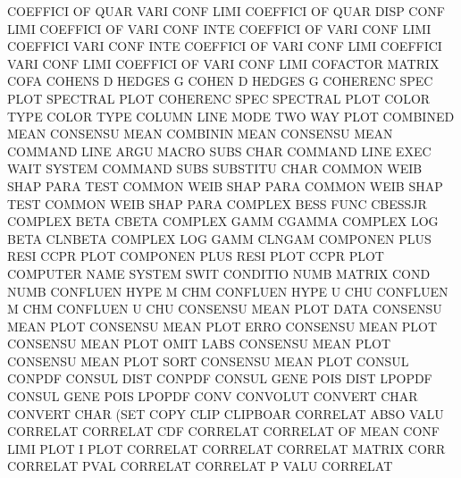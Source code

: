 COEFFICI OF   QUAR VARI CONF LIMI       COEFFICI OF   QUAR DISP CONF LIMI
COEFFICI OF   VARI CONF INTE            COEFFICI OF   VARI CONF LIMI
COEFFICI VARI CONF INTE                 COEFFICI OF   VARI CONF LIMI
COEFFICI VARI CONF LIMI                 COEFFICI OF   VARI CONF LIMI
COFACTOR                                MATRIX   COFA
COHENS   D                              HEDGES   G
COHEN    D                              HEDGES   G
COHERENC SPEC PLOT                      SPECTRAL PLOT
COHERENC SPEC                           SPECTRAL PLOT
COLOR    TYPE                           COLOR    TYPE
COLUMN   LINE MODE                      TWO      WAY  PLOT
COMBINED MEAN                           CONSENSU MEAN
COMBININ MEAN                           CONSENSU MEAN
COMMAND  LINE ARGU                      MACRO    SUBS CHAR
COMMAND  LINE EXEC WAIT                 SYSTEM
COMMAND  SUBS                           SUBSTITU CHAR
COMMON   WEIB SHAP PARA TEST            COMMON   WEIB SHAP PARA
COMMON   WEIB SHAP TEST                 COMMON   WEIB SHAP PARA
COMPLEX  BESS FUNC                      CBESSJR
COMPLEX  BETA                           CBETA
COMPLEX  GAMM                           CGAMMA
COMPLEX  LOG BETA                       CLNBETA
COMPLEX  LOG GAMM                       CLNGAM
COMPONEN PLUS RESI                      CCPR     PLOT
COMPONEN PLUS RESI PLOT                 CCPR     PLOT
COMPUTER NAME                           SYSTEM   SWIT
CONDITIO NUMB                           MATRIX   COND NUMB
CONFLUEN HYPE M                         CHM
CONFLUEN HYPE U                         CHU
CONFLUEN M                              CHM
CONFLUEN U                              CHU
CONSENSU MEAN PLOT DATA                 CONSENSU MEAN PLOT
CONSENSU MEAN PLOT ERRO                 CONSENSU MEAN PLOT
CONSENSU MEAN PLOT OMIT LABS            CONSENSU MEAN PLOT
CONSENSU MEAN PLOT SORT                 CONSENSU MEAN PLOT
CONSUL                                  CONPDF
CONSUL   DIST                           CONPDF
CONSUL   GENE POIS DIST                 LPOPDF
CONSUL   GENE POIS                      LPOPDF
CONV                                    CONVOLUT
CONVERT  CHAR                           CONVERT  CHAR (SET
COPY     CLIP                           CLIPBOAR
CORRELAT ABSO VALU                      CORRELAT
CORRELAT CDF                            CORRELAT
CORRELAT OF   MEAN CONF LIMI PLOT       I        PLOT
CORRELAT                                CORRELAT
CORRELAT                                MATRIX   CORR
CORRELAT PVAL                           CORRELAT
CORRELAT P    VALU                      CORRELAT
